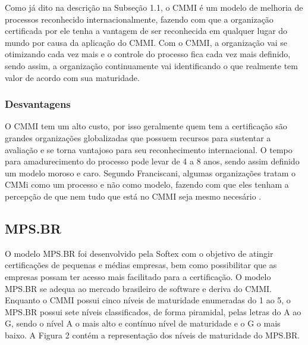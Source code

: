     Como já dito na descrição na Subseção 1.1, o CMMI é um modelo de melhoria
    de processos reconhecido internacionalmente, fazendo com que a organização
    certificada por ele tenha a vantagem de ser reconhecida em qualquer lugar
    do mundo por causa da aplicação do CMMI.
    Com o CMMI, a organização vai se otimizando cada vez mais e o controle do
    processo fica cada vez mais definido, sendo assim, a organização continuamente
    vai identificando o que realmente tem valor de acordo com sua maturidade.

    \subsubsection{Desvantagens}

    O CMMI tem um alto custo, por isso geralmente quem tem a certificação são
    grandes organizações globalizadas que possuem recursos para sustentar a
    avaliação e se torna vantajoso para seu reconhecimento internacional. O
    tempo para amadurecimento do processo pode levar de 4 a 8 anos, sendo assim
    definido um modelo moroso e caro. Segundo Franciscani, algumas organizações
    tratam o CMMi como um processo e não como modelo, fazendo com que eles tenham
    a percepção de que nem tudo que está no CMMI seja mesmo necesário
    \cite{francis2012}.


  \subsection{MPS.BR}

  O modelo MPS.BR foi desenvolvido pela Softex com o objetivo de atingir
  certificações de pequenas e médias empresas, bem como possibilitar que
  as empresas possam ter acesso mais facilitado para a certificação.
  O modelo MPS.BR se adequa ao mercado brasileiro de software e deriva do CMMI.
  Enquanto o CMMI possui cinco níveis de maturidade enumeradas do 1 ao 5, o
  MPS.BR possui sete níveis classificados, de forma piramidal,  pelas letras
  do A ao G, sendo o nível A o mais alto e contínuo nível de maturidade e o G
  o mais baixo. A Figura 2 contém a representação dos níveis de maturidade do
  MPS.BR.

